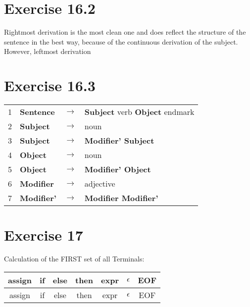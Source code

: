\documentclass[11pt]{article} %
\begin{document}
\section*{Exercise 16.2}
Rightmost derivation is the most clean one and does reflect the structure of the sentence in the best way, because of the continuous derivation of the subject. However, leftmost derivation

\section*{Exercise 16.3}
\begin{tabular}{llcl}
1
& \textbf{Sentence}
& $\rightarrow$
& \textbf{Subject} verb \textbf{Object} endmark	\\

2
& \textbf{Subject}
& $\rightarrow$
& noun \\

3
& \textbf{Subject}
& $\rightarrow$
& \textbf{Modifier' Subject} \\

4
& \textbf{Object}
& $\rightarrow$
& noun \\

5
& \textbf{Object}
& $\rightarrow$
& \textbf{Modifier' Object} \\

6
& \textbf{Modifier}
& $\rightarrow$
& adjective \\

7
& \textbf{Modifier'}
& $\rightarrow$
& \textbf{Modifier Modifier'} \\

\end{tabular}

\section*{Exercise 17}
Calculation of the FIRST set of all Terminals:\\

\begin{tabular}{|c|c|c|c|c|c|c|} \hline 
\textbf{assign}
& \textbf{if}
& \textbf{else}
& \textbf{then}
& \textbf{expr}
& \textbf{$\epsilon$}
& \textbf{EOF} \\\hline 

assign
& if
& else
& then
& expr
& $\epsilon$
& EOF \\\hline 
\end{tabular} \\
\end{document}
